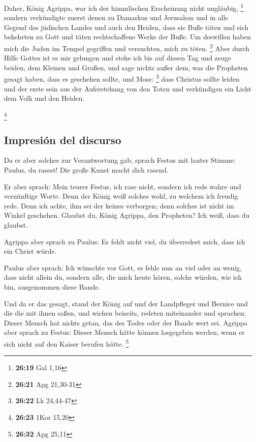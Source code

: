  Daher, König Agrippa, war ich der himmlischen
Erscheinung nicht ungläubig, \footnote{\textbf{26:19} Gal 1,16}
 sondern verkündigte zuerst denen zu Damaskus und
Jerusalem und in alle Gegend des jüdischen Landes und auch den Heiden,
dass sie Buße täten und sich bekehrten zu Gott und täten rechtschaffene
Werke der Buße.  Um deswillen haben mich die Juden im
Tempel gegriffen und versuchten, mich zu töten. \footnote{\textbf{26:21}
  Apg 21,30-31}  Aber durch Hilfe Gottes ist es mir
gelungen und stehe ich bis auf diesen Tag und zeuge beiden, dem Kleinen
und Großen, und sage nichts außer dem, was die Propheten gesagt haben,
dass es geschehen sollte, und Mose: \footnote{\textbf{26:22} Lk 24,44-47}
 dass Christus sollte leiden und der erste sein aus der
Auferstehung von den Toten und verkündigen ein Licht dem Volk und den
Heiden.

\footnote{\textbf{26:23} 1Kor 15,20}

\hypertarget{impresiuxf3n-del-discurso}{%
\subsection{Impresión del discurso}\label{impresiuxf3n-del-discurso}}

 Da er aber solches zur Verantwortung gab, sprach Festus
mit lauter Stimme: Paulus, du rasest! Die große Kunst macht dich rasend.

 Er aber sprach: Mein teurer Festus, ich rase nicht,
sondern ich rede wahre und vernünftige Worte.  Denn der
König weiß solches wohl, zu welchem ich freudig rede. Denn ich achte,
ihm sei der keines verborgen; denn solches ist nicht im Winkel
geschehen.  Glaubst du, König Agrippa, den Propheten? Ich
weiß, dass du glaubst.

 Agrippa aber sprach zu Paulus: Es fehlt nicht viel, du
überredest mich, dass ich ein Christ würde.

 Paulus aber sprach: Ich wünschte vor Gott, es fehle nun
an viel oder an wenig, dass nicht allein du, sondern alle, die mich
heute hören, solche würden, wie ich bin, ausgenommen diese Bande.

 Und da er das gesagt, stand der König auf und der
Landpfleger und Bernice und die die mit ihnen saßen,  und
wichen beiseits, redeten miteinander und sprachen: Dieser Mensch hat
nichts getan, das des Todes oder der Bande wert sei. 
Agrippa aber sprach zu Festus: Dieser Mensch hätte können losgegeben
werden, wenn er sich nicht auf den Kaiser berufen hätte. \footnote{\textbf{26:32}
  Apg 25,11}

